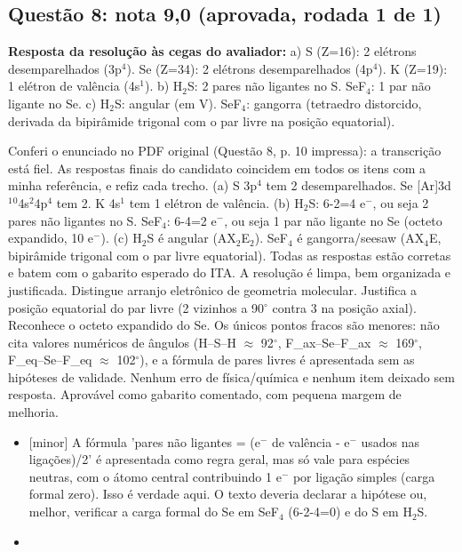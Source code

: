 \documentclass{article}%
\begin{document}
\subsection*{Questão 8: nota 9,0 (aprovada, rodada 1 de 1)}%
\textbf{Resposta da resolução às cegas do avaliador:} a) S (Z=16): 2 elétrons desemparelhados (3p$^{4}$). Se (Z=34): 2 elétrons desemparelhados (4p$^{4}$). K (Z=19): 1 elétron de valência (4s$^{1}$).\newline%
b) H$_{2}$S: 2 pares não ligantes no S. SeF$_{4}$: 1 par não ligante no Se.\newline%
c) H$_{2}$S: angular (em V). SeF$_{4}$: gangorra (tetraedro distorcido, derivada da bipirâmide trigonal com o par livre na posição equatorial).\par %
Conferi o enunciado no PDF original (Questão 8, p. 10 impressa): a transcrição está fiel. As respostas finais do candidato coincidem em todos os itens com a minha referência, e refiz cada trecho. (a) S 3p$^{4}$ tem 2 desemparelhados. Se {[}Ar{]}3d$^{1}$$^{0}$4s$^2$4p$^{4}$ tem 2. K 4s$^{1}$ tem 1 elétron de valência. (b) H$_{2}$S: 6-2=4 e$^{-}$, ou seja 2 pares não ligantes no S. SeF$_{4}$: 6-4=2 e$^{-}$, ou seja 1 par não ligante no Se (octeto expandido, 10 e$^{-}$). (c) H$_{2}$S é angular (AX$_{2}$E$_{2}$). SeF$_{4}$ é gangorra/seesaw (AX$_{4}$E, bipirâmide trigonal com o par livre equatorial). Todas as respostas estão corretas e batem com o gabarito esperado do ITA. A resolução é limpa, bem organizada e justificada. Distingue arranjo eletrônico de geometria molecular. Justifica a posição equatorial do par livre (2 vizinhos a 90$^\circ$ contra 3 na posição axial). Reconhece o octeto expandido do Se. Os únicos pontos fracos são menores: não cita valores numéricos de ângulos (H--S--H $\approx$ 92$^\circ$, F\_ax--Se--F\_ax $\approx$ 169$^\circ$, F\_eq--Se--F\_eq $\approx$ 102$^\circ$), e a fórmula de pares livres é apresentada sem as hipóteses de validade. Nenhum erro de física/química e nenhum item deixado sem resposta. Aprovável como gabarito comentado, com pequena margem de melhoria.%
\begin{itemize}%
\item%
{[}minor{]} A fórmula 'pares não ligantes = (e$^{-}$ de valência - e$^{-}$ usados nas ligações)/2' é apresentada como regra geral, mas só vale para espécies neutras, com o átomo central contribuindo 1 e$^{-}$ por ligação simples (carga formal zero). Isso é verdade aqui. O texto deveria declarar a hipótese ou, melhor, verificar a carga formal do Se em SeF$_{4}$ (6-2-4=0) e do S em H$_{2}$S.%
\item%

\end{itemize}$$
\end{document}
